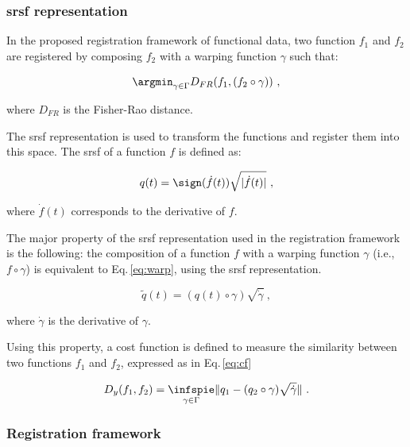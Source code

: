 \subsubsection{\acl*{srsf} representation} \label{sec:srsf}

In the proposed registration framework of functional data, two function $f_1$ and $f_2$ are registered by composing $f_2$ with a warping function $\gamma$ such that:

\begin{equation}
  \argmin_{\gamma \in \Gamma} D_{FR}(f_1, (f_2 \circ \gamma)) \ ,
  \label{eq:regfun}
\end{equation}

\noindent where $D_{FR}$ is the Fisher-Rao distance.

The \Ac{srsf} representation is used to transform the functions and register them into this space. The \ac{srsf} of a function $f$ is defined as:

\begin{equation}
  q(t) = \sign(\dot{f}(t))\sqrt{|\dot{f}(t)|} \ ,
  \label{eq:srsf}
\end{equation}

\noindent where $\dot{f}(t)$ corresponds to the derivative of $f$.

The major property of the \ac{srsf} representation used in the registration framework is the following: the composition of a function $f$ with a warping function $\gamma$ (i.e., $f \circ \gamma$) is equivalent to Eq.\,\ref{eq:warp}, using the \ac{srsf} representation.

\begin{equation}
  \tilde{q}(t) = (q(t) \circ \gamma) \sqrt{\dot{\gamma}} \ ,
  \label{eq:warp}
\end{equation}

\noindent where $\dot{\gamma}$ is the derivative of $\gamma$.

Using this property, a cost function is defined to measure the similarity between two functions $f_1$ and $f_2$, expressed as in Eq.\,\ref{eq:cf}

\begin{equation}
  D_y(f_1, f_2) = \underset{\gamma \in \Gamma}{\infspie} \| q_1 - (q_2 \circ \gamma) \sqrt{\dot{\gamma}} \| \ .
  \label{eq:cf}
\end{equation}

\subsubsection{Registration framework}\label{sec:regfra}

